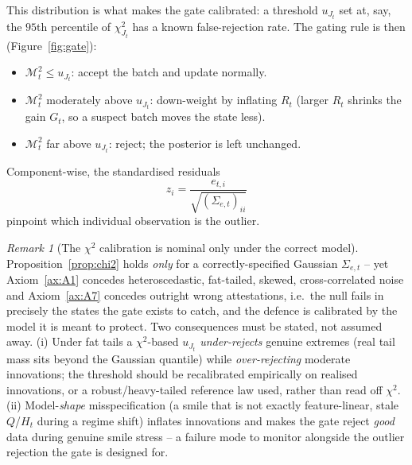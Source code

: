 \documentclass[11pt]{book}
\theoremstyle{plain}
\theoremstyle{definition}
\theoremstyle{remark}
\newtheorem{remark}[theorem]{Remark}
\begin{document}
This distribution is what makes the gate calibrated: a threshold $u_{J_t}$ set at,
say, the $95$th percentile of $\chi^2_{J_t}$ has a known false-rejection rate.
The gating rule is then (Figure~\ref{fig:gate}):
\begin{itemize}[nosep]
    \item $\mathcal{M}_t^2\le u_{J_t}$: accept the batch and update normally.
    \item $\mathcal{M}_t^2$ moderately above $u_{J_t}$: down-weight by inflating
        $R_t$ (larger $R_t$ shrinks the gain $G_t$, so a suspect batch moves the
        state less).
    \item $\mathcal{M}_t^2$ far above $u_{J_t}$: reject; the posterior is left
        unchanged.
\end{itemize}
Component-wise, the standardised residuals
\[
    z_i = \frac{e_{t,i}}{\sqrt{(\Sigma_{e,t})_{ii}}}
\]
pinpoint which individual observation is the outlier.

\begin{remark}[The $\chi^2$ calibration is nominal only under the correct model]
Proposition~\ref{prop:chi2} holds \emph{only} for a correctly-specified Gaussian
$\Sigma_{e,t}$ -- yet Axiom~\ref{ax:A1} concedes heteroscedastic, fat-tailed,
skewed, cross-correlated noise and Axiom~\ref{ax:A7} concedes outright wrong
attestations, i.e.\ the null fails in precisely the states the gate exists to
catch, and the defence is calibrated by the model it is meant to protect. Two
consequences must be stated, not assumed away. (i) Under fat tails a
$\chi^2$-based $u_{J_t}$ \emph{under-rejects} genuine extremes (real tail mass sits
beyond the Gaussian quantile) while \emph{over-rejecting} moderate innovations;
the threshold should be recalibrated empirically on realised innovations, or a
robust/heavy-tailed reference law used, rather than read off $\chi^2$. (ii)
Model-\emph{shape} misspecification (a smile that is not exactly feature-linear,
stale $Q$/$H_t$ during a regime shift) inflates innovations and makes the gate
reject \emph{good} data during genuine smile stress -- a failure mode to monitor
alongside the outlier rejection the gate is designed for.
\end{remark}
\end{document}

